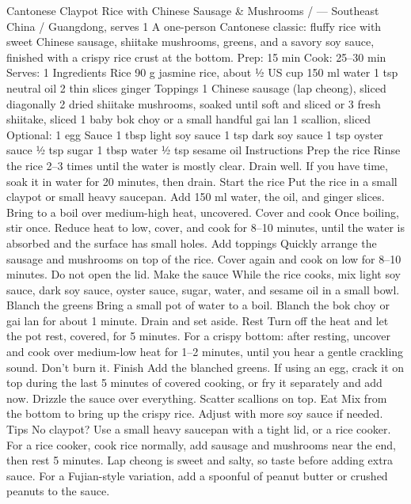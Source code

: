 Cantonese Claypot Rice with Chinese Sausage \& Mushrooms  /  — Southeast China / Guangdong, serves 1 A one-person Cantonese classic: fluffy rice with sweet Chinese sausage, shiitake mushrooms, greens, and a savory soy sauce, finished with a crispy rice crust at the bottom. Prep: 15 min Cook: 25–30 min Serves: 1 Ingredients Rice 90 g jasmine rice, about ½ US cup 150 ml water 1 tsp neutral oil 2 thin slices ginger Toppings 1 Chinese sausage (lap cheong), sliced diagonally 2 dried shiitake mushrooms, soaked until soft and sliced or 3 fresh shiitake, sliced 1 baby bok choy or a small handful gai lan 1 scallion, sliced Optional: 1 egg Sauce 1 tbsp light soy sauce 1 tsp dark soy sauce 1 tsp oyster sauce ½ tsp sugar 1 tbsp water ½ tsp sesame oil Instructions Prep the rice Rinse the rice 2–3 times until the water is mostly clear. Drain well. If you have time, soak it in water for 20 minutes, then drain. Start the rice Put the rice in a small claypot or small heavy saucepan. Add 150 ml water, the oil, and ginger slices. Bring to a boil over medium-high heat, uncovered. Cover and cook Once boiling, stir once. Reduce heat to low, cover, and cook for 8–10 minutes, until the water is absorbed and the surface has small holes. Add toppings Quickly arrange the sausage and mushrooms on top of the rice. Cover again and cook on low for 8–10 minutes. Do not open the lid. Make the sauce While the rice cooks, mix light soy sauce, dark soy sauce, oyster sauce, sugar, water, and sesame oil in a small bowl. Blanch the greens Bring a small pot of water to a boil. Blanch the bok choy or gai lan for about 1 minute. Drain and set aside. Rest Turn off the heat and let the pot rest, covered, for 5 minutes. For a crispy bottom: after resting, uncover and cook over medium-low heat for 1–2 minutes, until you hear a gentle crackling sound. Don’t burn it. Finish Add the blanched greens. If using an egg, crack it on top during the last 5 minutes of covered cooking, or fry it separately and add now. Drizzle the sauce over everything. Scatter scallions on top. Eat Mix from the bottom to bring up the crispy rice. Adjust with more soy sauce if needed. Tips No claypot? Use a small heavy saucepan with a tight lid, or a rice cooker. For a rice cooker, cook rice normally, add sausage and mushrooms near the end, then rest 5 minutes. Lap cheong is sweet and salty, so taste before adding extra sauce. For a Fujian-style variation, add a spoonful of peanut butter or crushed peanuts to the sauce.
\par


